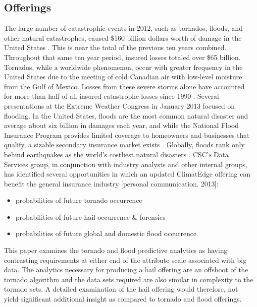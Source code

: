 \subsection{Offerings}
The large number of catastrophic events in 2012, such as tornados, floods, and other natural catastrophes, caused \$160 billion dollars worth of damage in the United States \cite{stalder}. This is near the total of the previous ten years combined. Throughout that same ten year period, insured losses totaled over \$65 billion. Tornados, while a worldwide phenomenon, occur with greater frequency in the United States due to the meeting of cold Canadian air with low-level moisture from the Gulf of Mexico. Losses from these severe storms alone have accounted for more than half of all insured catastrophe losses since 1990 \cite{lloyds}. Several presentations at the Extreme Weather Congress in January 2013 focused on flooding. In the United States, floods are the most common natural disaster and average about six billion in damages each year, and while the National Flood Insurance Program provides limited coverage to homeowners and businesses that qualify, a sizable secondary insurance market exists \cite{hope}. Globally, floods rank only behind earthquakes as the world's costliest natural disasters \cite{li}. \textsc{CSC's} Data Services group, in conjunction with industry analysts and other internal groups, has identified several opportunities in which an updated ClimatEdge offering can benefit the general insurance industry [personal communication, 2013]:
\begin{itemize}
    \item probabilities of future tornado occurrence
    \item probabilities of future hail occurrence \& forensics
    \item probabilities of future global and domestic flood occurrence
\end{itemize}
This paper examines the tornado and flood predictive analytics as having contrasting requirements at either end of the attribute scale associated with big data. The analytics necessary for producing a hail offering are an offshoot of the tornado algorithm and the data sets required are also similar in complexity to the tornado sets. A detailed examination of the hail offering would therefore, not yield significant additional insight as compared to tornado and flood offerings.